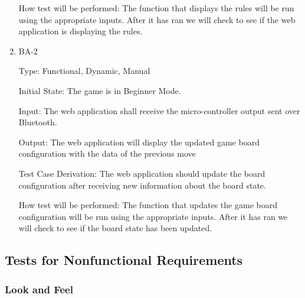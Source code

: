 \documentclass[12pt, titlepage]{article}
\begin{document}
\begin{enumerate}
      How test will be performed: The function that displays the rules
      will be run using the appropriate inputs. After it has ran we will check to see if the web application is displaying the rules.
  
      \item{BA-2\\}
  
      Type: Functional, Dynamic, Manual
                        
      Initial State: The game is in Beginner Mode.
                          
      Input: The web application shall receive the micro-controller output sent over Bluetooth.
                          
      Output: The web application will display the updated game board configuration with the data
      of the previous move
                          
      Test Case Derivation: The web application should update the board configuration after receiving new information about the board state. 
  
      How test will be performed: The function that updates the game board configuration
      will be run using the appropriate inputs. After it has ran we will check to see if the board state has been updated.
  
    \end{enumerate}

\subsection{Tests for Nonfunctional Requirements}

\subsubsection{Look and Feel}
\end{document}
